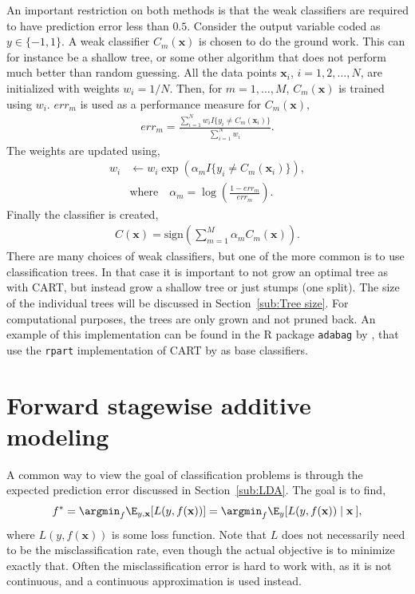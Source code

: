 An important restriction on both methods is that the weak classifiers are required to have prediction error less than $0.5$.
Consider the output variable coded as $y \in \{-1, 1\}$. A weak classifier $C_m(\mathbf{x})$ is chosen to do the ground work. This can for instance be a shallow tree, or some other algorithm that does not perform much better than random guessing. All the data points $\mathbf{x}_i$, $i = 1, 2, \ldots, N$, are initialized with weights $w_i = 1/N$. Then, for $m = 1, \ldots, M$, $C_m(\mathbf{x})$ is trained using $w_i$. $err_m$ is used as a performance measure for $C_m(\mathbf{x})$,
\begin{align}
  err_m =  \frac{\sum^{N}_{i=1} w_i I\{y_i \neq C_m(\mathbf{x}_i)\}}{\sum^{N}_{i=1} w_i}.
\end{align}
The weights are updated using, 
\begin{align}
  w_i &\leftarrow w_i \exp\left( \alpha_m I\{y_i \neq C_m(\mathbf{x}_i)\} \right), \\
  &\text{where} \quad \alpha_m = \log\left(  \frac{1-err_m}{err_m} \right).
\end{align}
Finally the classifier is created,
\begin{align}
  C( \mathbf{x}) = \text{sign}\left( \sum^{M}_{m=1} \alpha_m C_m(\mathbf{x}) \right).
\end{align}
There are many choices of weak classifiers, but one of the more common is to use classification trees. In that case it is important to not grow an optimal tree as with CART, but instead grow a shallow tree or just stumps (one split). The size of the individual trees will be discussed in Section~\ref{sub:Tree size}. For computational purposes, the trees are only grown and not pruned back.
An example of this implementation can be found in the R package \verb+adabag+ by \cite{adabag}, that use the \verb+rpart+ implementation of CART by \cite{rpart} as base classifiers.

\section{Forward stagewise additive modeling}
\label{sec:Forward stagewise additive modeling}
A common way to view the goal of classification problems is through the expected prediction error discussed in Section~\ref{sub:LDA}. The goal is to find,
\begin{align}
  \label{eq:fargmin} 
  f^* = \argmin_f \E_{y, \mathbf{x}}[L(y,f(\mathbf{x}))] = \argmin_f \E_y [L(y,f(\mathbf{x})) \mid \mathbf{x}\:] ,
\end{align}
where $L(y, f(\mathbf{x}))$ is some loss function. 
Note that $L$ does not necessarily need to be the misclassification rate, even though the actual objective is to minimize exactly that.
Often the misclassification error is hard to work with, as it is not continuous, and a continuous approximation is used instead.

